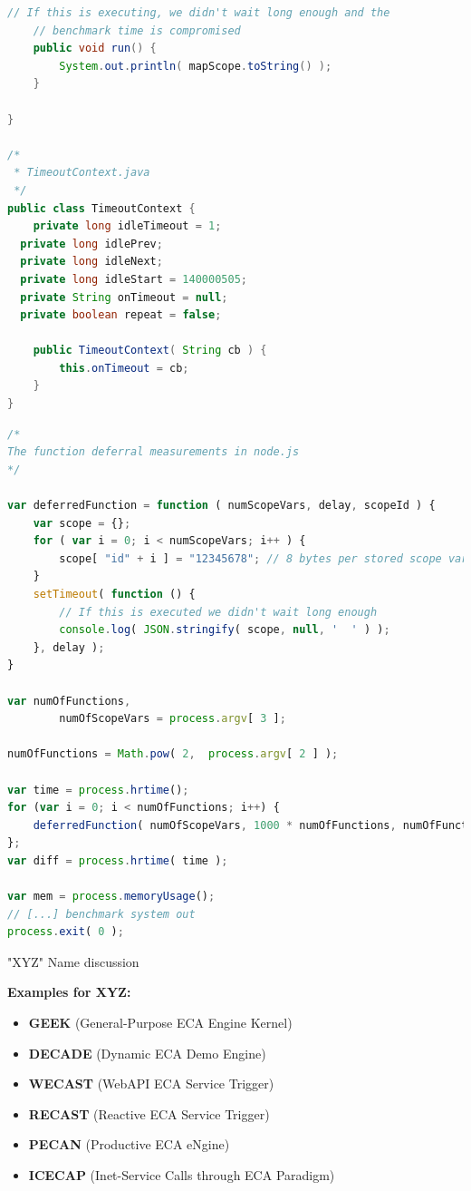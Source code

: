 \begin{lstlisting}[frame=single,label=lst_bm_java,language=Java,caption=Closure Benchmarking: Java Code]
	// If this is executing, we didn't wait long enough and the
	// benchmark time is compromised
	public void run() {
		System.out.println( mapScope.toString() );
	}

}

/*
 * TimeoutContext.java
 */
public class TimeoutContext {
	private long idleTimeout = 1;
  private long idlePrev;
  private long idleNext;
  private long idleStart = 140000505;
  private String onTimeout = null;
  private boolean repeat = false;

	public TimeoutContext( String cb ) {
		this.onTimeout = cb;
	}
}

\end{lstlisting}

\begin{lstlisting}[frame=single,float=h,label=lst_bm_js,language=JavaScript,caption=Closure Benchmarking: JavaScript Code]
/*
The function deferral measurements in node.js
*/

var deferredFunction = function ( numScopeVars, delay, scopeId ) {
	var scope = {};
	for ( var i = 0; i < numScopeVars; i++ ) {
		scope[ "id" + i ] = "12345678"; // 8 bytes per stored scope variable
	}
	setTimeout( function () {
		// If this is executed we didn't wait long enough
		console.log( JSON.stringify( scope, null, '  ' ) );
	}, delay );
}

var numOfFunctions,
		numOfScopeVars = process.argv[ 3 ];

numOfFunctions = Math.pow( 2,  process.argv[ 2 ] );

var time = process.hrtime();
for (var i = 0; i < numOfFunctions; i++) {
	deferredFunction( numOfScopeVars, 1000 * numOfFunctions, numOfFunctions + "(" + i + ")" );
};
var diff = process.hrtime( time );

var mem = process.memoryUsage();
// [...] benchmark system out
process.exit( 0 );

\end{lstlisting}


\newpage
{\huge "XYZ" Name discussion}



\textbf{Examples for XYZ:}
\begin{itemize}
  \item \textbf{GEEK} (General-Purpose ECA Engine Kernel)
  \item \textbf{DECADE} (Dynamic ECA Demo Engine)
  \item \textbf{WECAST} (WebAPI ECA Service Trigger)
  \item \textbf{RECAST} (Reactive ECA Service Trigger)
  \item \textbf{PECAN} (Productive ECA eNgine)
  \item \textbf{ICECAP} (Inet-Service Calls through ECA Paradigm)
\end{itemize}
